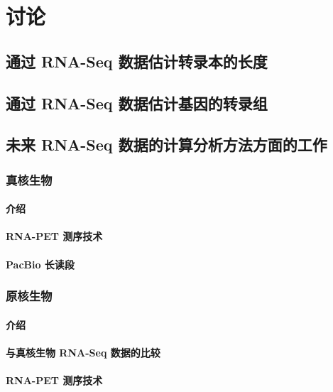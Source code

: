 \chapter{讨论}

\section{通过 RNA-Seq 数据估计转录本的长度}

\section{通过 RNA-Seq 数据估计基因的转录组}

\section{未来 RNA-Seq 数据的计算分析方法方面的工作}

\subsection{真核生物}

\subsubsection{介绍} %

\subsubsection{RNA-PET 测序技术} %

\subsubsection{PacBio 长读段} %

\subsection{原核生物}

\subsubsection{介绍} %

\subsubsection{与真核生物 RNA-Seq 数据的比较} %

\subsubsection{RNA-PET 测序技术} %